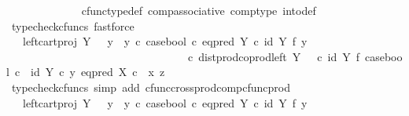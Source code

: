 \begin{isabellebody}
\ \ \ \ \ \ \ \ \ \ \ \ \isamarkupfalse%
\ cfunc{\isacharunderscore}{\kern0pt}type{\isacharunderscore}{\kern0pt}def\ comp{\isacharunderscore}{\kern0pt}associative\ comp{\isacharunderscore}{\kern0pt}type\ into{\isacharunderscore}{\kern0pt}def\ \isamarkupfalse%
\ {\isacharparenleft}{\kern0pt}typecheck{\isacharunderscore}{\kern0pt}cfuncs{\isacharcomma}{\kern0pt}\ fastforce{\isacharparenright}{\kern0pt}\isanewline
\ \ \ \ \ \ \ \ \ \ \isamarkupfalse%
\ \isamarkupfalse%
\ {\isachardoublequoteopen}{\isachardot}{\kern0pt}{\isachardot}{\kern0pt}{\isachardot}{\kern0pt}\ {\isacharequal}{\kern0pt}\ {\isacharparenleft}{\kern0pt}left{\isacharunderscore}{\kern0pt}cart{\isacharunderscore}{\kern0pt}proj\ Y\ {\isasymone}\ {\isasymamalg}\ {\isacharparenleft}{\kern0pt}{\isacharparenleft}{\kern0pt}y{}\ {\isasymamalg}\ y{}{\isacharparenright}{\kern0pt}\ {\isasymcirc}\isactrlsub c\ case{\isacharunderscore}{\kern0pt}bool\ {\isasymcirc}\isactrlsub c\ eq{\isacharunderscore}{\kern0pt}pred\ Y\ {\isasymcirc}\isactrlsub c\ {\isacharparenleft}{\kern0pt}id\ Y\ {\isasymtimes}\isactrlsub f\ y{}{\isacharparenright}{\kern0pt}{\isacharparenright}{\kern0pt}{\isacharparenright}{\kern0pt}\isanewline
\ \ \ \ \ \ \ \ \ \ \ \ \ \ \ \ \ \ \ \ \ \ \ \ \ \ \ \ \ \ \ \ \ {\isasymcirc}\isactrlsub c\ dist{\isacharunderscore}{\kern0pt}prod{\isacharunderscore}{\kern0pt}coprod{\isacharunderscore}{\kern0pt}left\ Y\ {\isasymone}\ {\isasymone}\ {\isasymcirc}\isactrlsub c\ {\isacharparenleft}{\kern0pt}id\ Y\ {\isasymtimes}\isactrlsub f\ case{\isacharunderscore}{\kern0pt}bool{\isacharparenright}{\kern0pt}\ {\isasymcirc}\isactrlsub c\ \ {\isasymlangle}id\ Y\ {\isasymcirc}\isactrlsub c\ y{}{\isacharcomma}{\kern0pt}\ eq{\isacharunderscore}{\kern0pt}pred\ X\ {\isasymcirc}\isactrlsub c\ \ {\isasymlangle}x{\isacharcomma}{\kern0pt}\ z{\isasymrangle}{\isasymrangle}{\isachardoublequoteclose}\isanewline
\ \ \ \ \ \ \ \ \ \ \ \ \isamarkupfalse%
\ {\isacharparenleft}{\kern0pt}typecheck{\isacharunderscore}{\kern0pt}cfuncs{\isacharcomma}{\kern0pt}\ simp\ add{\isacharcolon}{\kern0pt}\ cfunc{\isacharunderscore}{\kern0pt}cross{\isacharunderscore}{\kern0pt}prod{\isacharunderscore}{\kern0pt}comp{\isacharunderscore}{\kern0pt}cfunc{\isacharunderscore}{\kern0pt}prod{\isacharparenright}{\kern0pt}\isanewline
\ \ \ \ \ \ \ \ \ \ \isamarkupfalse%
\ \isamarkupfalse%
\ {\isachardoublequoteopen}{\isachardot}{\kern0pt}{\isachardot}{\kern0pt}{\isachardot}{\kern0pt}\ {\isacharequal}{\kern0pt}\ {\isacharparenleft}{\kern0pt}left{\isacharunderscore}{\kern0pt}cart{\isacharunderscore}{\kern0pt}proj\ Y\ {\isasymone}\ {\isasymamalg}\ {\isacharparenleft}{\kern0pt}{\isacharparenleft}{\kern0pt}y{}\ {\isasymamalg}\ y{}{\isacharparenright}{\kern0pt}\ {\isasymcirc}\isactrlsub c\ case{\isacharunderscore}{\kern0pt}bool\ {\isasymcirc}\isactrlsub c\ eq{\isacharunderscore}{\kern0pt}pred\ Y\ {\isasymcirc}\isactrlsub c\ {\isacharparenleft}{\kern0pt}id\ Y\ {\isasymtimes}\isactrlsub f\ y{}{\isacharparenright}{\kern0pt}{\isacharparenright}{\kern0pt}{\isacharparenright}{\kern0pt}\ \isanewline

\end{isabellebody}
